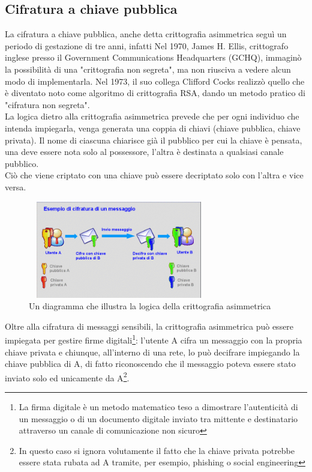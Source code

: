 \subsection{Cifratura a chiave pubblica}
La cifratura a chiave pubblica, anche detta crittografia asimmetrica seguì un periodo di gestazione di tre anni, infatti Nel 1970, James H. Ellis, crittografo inglese presso il Government Communications Headquarters (GCHQ), immaginò la possibilità di una "crittografia non segreta", ma non riusciva a vedere alcun modo di implementarla. Nel 1973, il suo collega Clifford Cocks realizzò quello che è diventato noto come algoritmo di crittografia RSA, dando un metodo pratico di "cifratura non segreta".\cite{CrittografiaAsimmetricaWiki}
\\
La logica dietro alla crittografia asimmetrica prevede che per ogni individuo che intenda impiegarla, venga generata una coppia di chiavi (chiave pubblica, chiave privata). Il nome di ciascuna chiarisce già il pubblico per cui la chiave è pensata, una deve essere nota solo al possessore, l'altra è destinata a qualsiasi canale pubblico.
\\
Ciò che viene criptato con una chiave può essere decriptato solo con l'altra e vice versa.

\begin{figure}[h]
    \centering
    \includegraphics[width=300px, height=160px]{./images/cifratura_messaggio.png}
    \caption{Un diagramma che illustra la logica della crittografia asimmetrica}
    \label{fig:asymmetricalCryptography}
\end{figure}

Oltre alla cifratura di messaggi sensibili, la crittografia asimmetrica può essere impiegata per gestire firme digitali\footnote{
La firma digitale è un metodo matematico teso a dimostrare l'autenticità di un messaggio o di un documento digitale inviato tra mittente e destinatario attraverso un canale di comunicazione non sicuro\cite{FirmaDigitale}
}: l'utente A cifra un messaggio con la propria chiave privata e chiunque, all'interno di una rete, lo può decifrare impiegando la chiave pubblica di A, di fatto riconoscendo che il messaggio poteva essere stato inviato solo ed unicamente da A\footnote{
In questo caso si ignora volutamente il fatto che la chiave privata potrebbe essere stata rubata ad A tramite, per esempio, phishing o social engineering
}.
